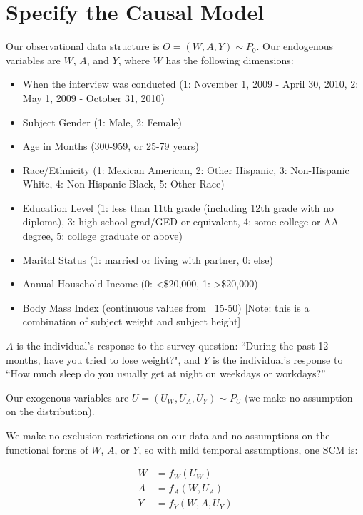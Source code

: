 \documentclass{article}
\begin{document}
\section{Specify the Causal Model}

Our observational data structure is $O=(W,A,Y) \sim P_0$. Our endogenous variables are $W$, $A$, and $Y$, where $W$ has the following dimensions:

\begin{itemize}
\item When the interview was conducted (1: November 1, 2009 - April 30, 2010, 2: May 1, 2009 - October 31, 2010)
\item Subject Gender (1: Male, 2: Female)
\item Age in Months (300-959, or 25-79 years)
\item Race/Ethnicity (1: Mexican American, 2: Other Hispanic, 3: Non-Hispanic White, 4: Non-Hispanic Black, 5: Other Race)
\item Education Level (1: less than 11th grade (including 12th grade with no diploma), 3: high school grad/GED or equivalent, 4: some college or AA degree, 5: college graduate or above)
\item Marital Status (1: married or living with partner, 0: else)
\item Annual Household Income (0: <\$20,000, 1: >\$20,000)
\item Body Mass Index (continuous values from ~15-50) [Note: this is a combination of subject weight and subject height]
\end{itemize}

$A$ is the individual's response to the survey question: ``During the past 12 months, have you tried to lose weight?", and $Y$ is the individual's response to ``How much sleep do you usually get at night on weekdays or workdays?''  

Our exogenous variables are $U = (U_W, U_A, U_Y) \sim P_U$ (we make no assumption on the distribution).  

We make no exclusion restrictions on our data and no assumptions on the functional forms of $W$, $A$, or $Y$, so with mild temporal assumptions, one SCM is:

\begin{align*}
W &= f_{W}(U_{W}) \\
A &= f_{A}(W,U_{A}) \\
Y &= f_{Y}(W,A,U_{Y}) \\
\end{align*}
\end{document}
